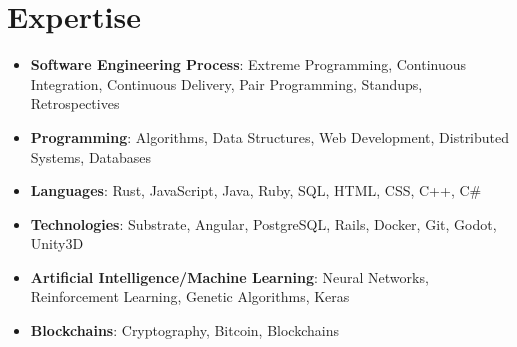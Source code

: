 \documentclass[letterpaper,11pt]{article}
\newcommand{\resumeItem}[2]{
  \item\small{
    \textbf{#1}{: #2 \vspace{-2pt}}
  }
}
\newcommand{\resumeSubItem}[2]{\resumeItem{#1}{#2}\vspace{-4pt}}
\newcommand{\resumeSubHeadingListStart}{\begin{itemize}[leftmargin=*]}
\newcommand{\resumeSubHeadingListEnd}{\end{itemize}}
\begin{document}
\section{Expertise}
  \resumeSubHeadingListStart
    \resumeSubItem{Software Engineering Process}
      {Extreme Programming, Continuous Integration, Continuous Delivery, Pair Programming, Standups, Retrospectives}
    \resumeSubItem{Programming}
      {Algorithms, Data Structures, Web Development, Distributed Systems, Databases}
    \resumeSubItem{Languages}
      {Rust, JavaScript, Java, Ruby, SQL, HTML, CSS, C++, C\#}
    \resumeSubItem{Technologies}
      {Substrate, Angular, PostgreSQL, Rails, Docker, Git, Godot, Unity3D}
    \resumeSubItem{Artificial Intelligence/Machine Learning}
      {Neural Networks, Reinforcement Learning, Genetic Algorithms, Keras}
    \resumeSubItem{Blockchains}
      {Cryptography, Bitcoin, Blockchains}
  \resumeSubHeadingListEnd

%


\end{document}
